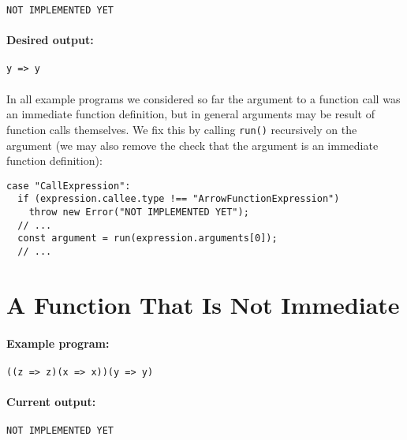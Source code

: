 \documentclass[12pt, oneside]{book}
\begin{document}
\begin{verbatim}
NOT IMPLEMENTED YET
\end{verbatim}

\paragraph{Desired output:}

\begin{verbatim}
y => y
\end{verbatim}

\paragraph{}

In all example programs we considered so far the argument to a function call was an immediate function definition, but in general arguments may be result of function calls themselves. We fix this by calling \texttt{run()} recursively on the argument (we may also remove the check that the argument is an immediate function definition):

\begin{verbatim}
case "CallExpression":
  if (expression.callee.type !== "ArrowFunctionExpression")
    throw new Error("NOT IMPLEMENTED YET");
  // ...
  const argument = run(expression.arguments[0]);
  // ...
\end{verbatim}

\section{A Function That Is Not Immediate}
\label{A Function That Is Not Immediate}

\paragraph{Example program:}

\begin{verbatim}
((z => z)(x => x))(y => y)
\end{verbatim}

\paragraph{Current output:}

\begin{verbatim}
NOT IMPLEMENTED YET
\end{verbatim}
\end{document}
